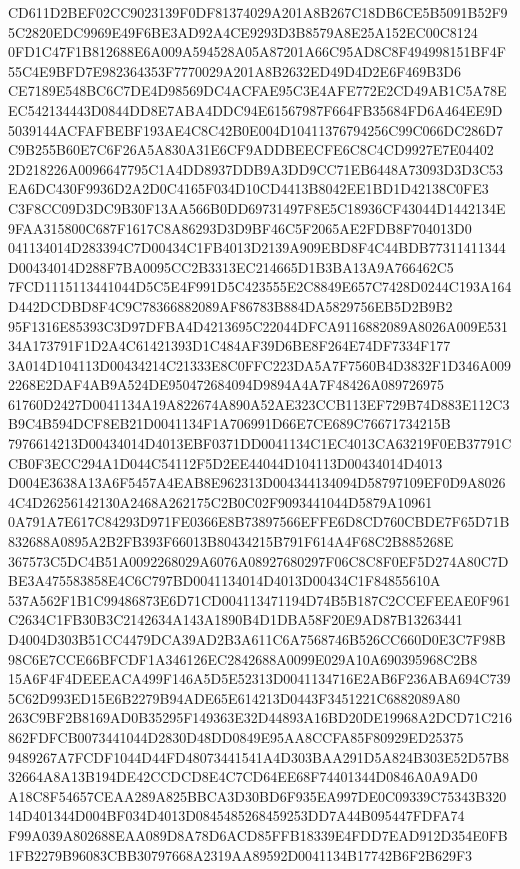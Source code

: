 \documentclass[UTF8,fontset=fandol,zihao=-4,a4paper]{ctexart}
\begin{document}
{{CD611D2BEF02CC9023139F0DF81374029A201A8B267C18DB6CE5B5091B52F95C2820EDC9969E49F6BE3AD92A4CE9293D3B8579A8E25A152EC00C8124
0FD1C47F1B812688E6A009A594528A05A87201A66C95AD8C8F494998151BF4F55C4E9BFD7E982364353F7770029A201A8B2632ED49D4D2E6F469B3D6
CE7189E548BC6C7DE4D98569DC4ACFAE95C3E4AFE772E2CD49AB1C5A78EEC542134443D0844DD8E7ABA4DDC94E61567987F664FB35684FD6A464EE9D
5039144ACFAFBEBF193AE4C8C42B0E004D10411376794256C99C066DC286D7C9B255B60E7C6F26A5A830A31E6CF9ADDBEECFE6C8C4CD9927E7E04402
2D218226A0096647795C1A4DD8937DDB9A3DD9CC71EB6448A73093D3D3C53EA6DC430F9936D2A2D0C4165F034D10CD4413B8042EE1BD1D42138C0FE3
C3F8CC09D3DC9B30F13AA566B0DD69731497F8E5C18936CF43044D1442134E9FAA315800C687F1617C8A86293D3D9BF46C5F2065AE2FDB8F704013D0
041134014D283394C7D00434C1FB4013D2139A909EBD8F4C44BDB77311411344D00434014D288F7BA0095CC2B3313EC214665D1B3BA13A9A766462C5
7FCD1115113441044D5C5E4F991D5C423555E2C8849E657C7428D0244C193A164D442DCDBD8F4C9C78366882089AF86783B884DA5829756EB5D2B9B2
95F1316E85393C3D97DFBA4D4213695C22044DFCA9116882089A8026A009E53134A173791F1D2A4C61421393D1C484AF39D6BE8F264E74DF7334F177
3A014D104113D00434214C21333E8C0FFC223DA5A7F7560B4D3832F1D346A0092268E2DAF4AB9A524DE950472684094D9894A4A7F48426A089726975
61760D2427D0041134A19A822674A890A52AE323CCB113EF729B74D883E112C3B9C4B594DCF8EB21D0041134F1A706991D66E7CE689C76671734215B
7976614213D00434014D4013EBF0371DD0041134C1EC4013CA63219F0EB37791CCB0F3ECC294A1D044C54112F5D2EE44044D104113D00434014D4013
D004E3638A13A6F5457A4EAB8E962313D004344134094D58797109EF0D9A80264C4D26256142130A2468A262175C2B0C02F9093441044D5879A10961
0A791A7E617C84293D971FE0366E8B73897566EFFE6D8CD760CBDE7F65D71B832688A0895A2B2FB393F66013B80434215B791F614A4F68C2B885268E
367573C5DC4B51A0092268029A6076A08927680297F06C8C8F0EF5D274A80C7DBE3A475583858E4C6C797BD0041134014D4013D00434C1F84855610A
537A562F1B1C99486873E6D71CD004113471194D74B5B187C2CCEFEEAE0F961C2634C1FB30B3C2142634A143A1890B4D1DBA58F20E9AD87B13263441
D4004D303B51CC4479DCA39AD2B3A611C6A7568746B526CC660D0E3C7F98B98C6E7CCE66BFCDF1A346126EC2842688A0099E029A10A690395968C2B8
15A6F4F4DEEEACA499F146A5D5E52313D0041134716E2AB6F236ABA694C7395C62D993ED15E6B2279B94ADE65E614213D0443F3451221C6882089A80
263C9BF2B8169AD0B35295F149363E32D44893A16BD20DE19968A2DCD71C216862FDFCB0073441044D2830D48DD0849E95AA8CCFA85F80929ED25375
9489267A7FCDF1044D44FD48073441541A4D303BAA291D5A824B303E52D57B832664A8A13B194DE42CCDCD8E4C7CD64EE68F74401344D0846A0A9AD0
A18C8F54657CEAA289A825BBCA3D30BD6F935EA997DE0C09339C75343B32014D401344D004BF034D4013D0845485268459253DD7A44B095447FDFA74
F99A039A802688EAA089D8A78D6ACD85FFB18339E4FDD7EAD912D354E0FB1FB2279B96083CBB30797668A2319AA89592D0041134B17742B6F2B629F3
}}
\end{document}
